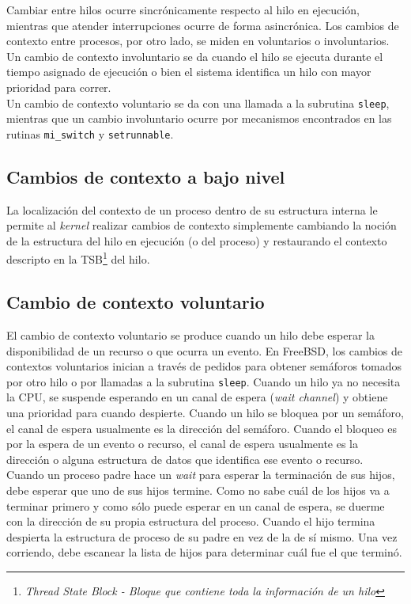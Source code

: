 \documentclass[a4paper]{book}
\begin{document}
Cambiar entre hilos ocurre sincrónicamente respecto al hilo en ejecución, mientras que atender interrupciones ocurre de forma asincrónica. Los cambios de contexto entre procesos, por otro lado, se miden en voluntarios o involuntarios.\\

Un cambio de contexto involuntario se da cuando el hilo se ejecuta durante el tiempo asignado de ejecución o bien el sistema identifica un hilo con mayor prioridad para correr.\\

Un cambio de contexto voluntario se da con una llamada a la subrutina \verb|sleep|, mientras que un cambio involuntario ocurre por mecanismos encontrados en las rutinas \verb|mi_switch| y \verb|setrunnable|.

\subsection{Cambios de contexto a bajo nivel}

La localización del contexto de un proceso dentro de su estructura interna le permite al \emph{kernel} realizar cambios de contexto simplemente cambiando la noción de la estructura del hilo en ejecución (o del proceso) y restaurando el contexto descripto en la TSB\footnote{\emph{Thread State Block - Bloque que contiene toda la informaci\'on de un hilo}}  del hilo.

\subsection{Cambio de contexto voluntario}

El cambio de contexto voluntario se produce cuando un hilo debe esperar la disponibilidad de un recurso o que ocurra un evento. En FreeBSD, los cambios de contextos voluntarios inician a través de pedidos para obtener semáforos tomados por otro hilo o por llamadas a la subrutina \verb|sleep|. Cuando un hilo ya no necesita la CPU, se suspende esperando en un canal de espera (\emph{wait channel}) y obtiene una prioridad para cuando despierte. Cuando un hilo se bloquea por un semáforo, el canal de espera usualmente es la dirección del semáforo. Cuando el bloqueo es por la espera de un evento o recurso, el canal de espera usualmente es la dirección o alguna estructura de datos que identifica ese evento o recurso.\\

Cuando un proceso padre hace un \emph{wait} para esperar la terminación de sus hijos, debe esperar que uno de sus hijos termine. Como no sabe cuál de los hijos va a terminar primero y como sólo puede esperar en un canal de espera, se duerme con la dirección de su propia estructura del proceso. Cuando el hijo termina despierta la estructura de proceso de su padre en vez de la de sí mismo. Una vez corriendo, debe escanear la lista de hijos para determinar cuál fue el que terminó.\\
\end{document}
